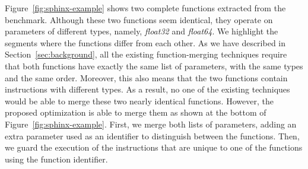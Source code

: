 Figure~\ref{fig:sphinx-example} shows two complete functions extracted from the
 benchmark.
Although these two functions seem identical, they operate on parameters of
different types, namely, \textit{float32} and \textit{float64}.
We highlight the segments where the functions differ from each other.
As we have described in Section~\ref{sec:background}, all the existing 
function-merging techniques require that both functions have exactly the same 
list of parameters, with the same types and the same order.
Moreover, this also means that the two functions contain instructions with
different types.
As a result, no one of the existing techniques would be able to merge these two
nearly identical functions.
However, the proposed optimization is able to merge them as shown at the bottom
of Figure~\ref{fig:sphinx-example}.
First, we merge both lists of parameters, adding an extra parameter used as an
identifier to distinguish between the functions.
Then, we guard the execution of the instructions that are unique to one of
the functions using the function identifier.


